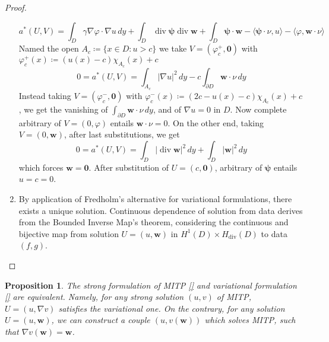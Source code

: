 \documentclass[10pt, a4paper, twoside, openright]{book}
\theoremstyle{definition}
\theoremstyle{plain}
\theoremstyle{plain}
\theoremstyle{plain}
\newtheorem{proposition}[subsection]{Proposition}
\theoremstyle{plain}
\theoremstyle{plain}
\theoremstyle{plain}
\theoremstyle{plain}
\theoremstyle{plain}
\DeclareMathOperator{\divergence}{div}
\let\phi\varphi
\begin{document}
\begin{proof}
\begin{enumerate}
\begin{equation*}
  a^*(U,V)= \int_D \gamma \nabla \phi \cdot\nabla u\,dy + \int_D\divergence \bm{\psi}\divergence\bm{w} + \int_D\bm{\psi}\cdot\bm{w} - \langle \bm{\psi}\cdot\nu, u \rangle- \langle \phi,\bm{w}\cdot\nu\rangle
\end{equation*}
 Named the open $A_c\coloneqq\{x\in D: u>c\}$ we take $V=(\phi_c^+, \bm{0})$ with $\phi_c^+(x)\coloneqq (u(x)-c)\chi_{A_c}(x) + c$
\begin{equation*}
  0 = a^*(U,V)= \int_{A_c} |\nabla u|^2\,dy - c\int_{\partial D}\bm{w}\cdot\nu\, dy
\end{equation*}
 Instead taking $V=(\phi_c^-,\bm{0})$ with $\phi_c^-(x)\coloneqq (2c - u(x) - c)\chi_{A_c}(x) + c$, we get the vanishing of 
 $\int_{\partial D}\bm{w}\cdot\nu\,dy$, 
 and of $\nabla u=0$ in $D$. 
 Now complete arbitrary of $V=(0,\phi)$ entails 
 $\bm{w}\cdot\nu =0$.
 On the other end, taking $V=(0, \bm{w})$, after last substitutions, we get
\begin{equation*}
 0=a^*(U,V)=\int_D|\divergence \bm{w}|^2\,dy + \int_D|\bm{w}|^2\,dy
\end{equation*}
which forces $\bm{w}=\bm{0}$. After substitution of $U=(c,\bm 0)$, arbitrary of $\bm \psi$ entails $u=c=0$. 
\item By application of Fredholm's alternative for variational formulations, 
there exists a unique solution.
Continuous dependence of solution from data derives from the Bounded Inverse Map's theorem, considering the continuous and bijective map from solution $U=(u,\bm w )$ in $H^1(D)\times H_{\divergence}(D)$ to data $(f,g)$.
\end{enumerate}
\end{proof}
\begin{proposition}
 The strong formulation of MITP \ref{} and variational formulation \ref{} are equivalent.
 Namely, for any strong solution $(u,v)$ of MITP, $U=(u,\nabla v)$ satisfies the variational one. On the contrary, for any solution $U=(u,\bm w)$, we can construct a couple $(u,v({\bm w}))$ which solves MITP, such that $\nabla v(\bm w)=\bm w$.
\end{proposition}
\end{document}
